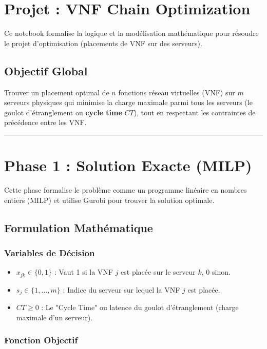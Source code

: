 \documentclass{article}
\begin{document}
\section{Projet : VNF Chain Optimization}

Ce notebook formalise la logique et la modélisation mathématique pour résoudre le projet d'optimisation (placements de VNF sur des serveurs).

\subsection{Objectif Global}
Trouver un placement optimal de $n$ fonctions réseau virtuelles (VNF) sur $m$ serveurs physiques qui minimise la charge maximale parmi tous les serveurs (le goulot d'étranglement ou \textbf{cycle time} $CT$), tout en respectant les contraintes de précédence entre les VNF.

\vspace{1em}
\hrule
\vspace{1em}

\section{Phase 1 : Solution Exacte (MILP)}

Cette phase formalise le problème comme un programme linéaire en nombres entiers (MILP) et utilise Gurobi pour trouver la solution optimale.

\subsection{Formulation Mathématique}

\subsubsection{Variables de Décision}

\begin{itemize}
    \item $x_{jk} \in \{0, 1\}$ : Vaut 1 si la VNF $j$ est placée sur le serveur $k$, 0 sinon.
    \item $s_j \in \{1, \dots, m\}$ : Indice du serveur sur lequel la VNF $j$ est placée.
    \item $CT \ge 0$ : Le "Cycle Time" ou latence du goulot d'étranglement (charge maximale d'un serveur).
\end{itemize}

\subsubsection{Fonction Objectif}
\end{document}
